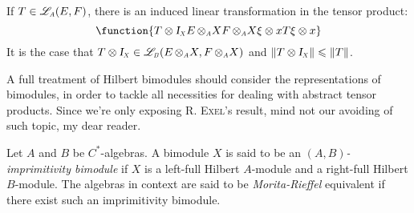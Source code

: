 If $T\in \sub\adj{A}(E,F)$, there is an induced linear transformation in the tensor product:
\begin{equation*}
	\function{{T\otimes \sub\Id X}{E\,\sub\otimes A X}{F\,\sub\otimes A X}{\xi\otimes x}{T\xi\otimes x}}
\end{equation*}
It is the case that $T\otimes \sub\Id X \in \sub\adj{B}(E\,\sub\otimes A X, F\,\sub\otimes A X)$ and $\|T\otimes \sub\Id X\| \leqslant \|T\|$.

A full treatment of Hilbert bimodules should consider the representations of bimodules, in order to tackle all necessities for dealing with abstract tensor products. Since we're only exposing \textsc{R. Exel}'s result, mind not our avoiding of such topic, my dear reader.

\begin{definicao}
	Let $A$ and $B$ be $C^*$-algebras. A bimodule $X$ is said to be an \textit{$(A,B)$-imprimitivity bimodule} if $X$ is a left-full Hilbert $A$-module and a right-full Hilbert $B$-module. The algebras in context are said to be \textit{Morita-Rieffel} equivalent if there exist such an imprimitivity bimodule.
\end{definicao}

